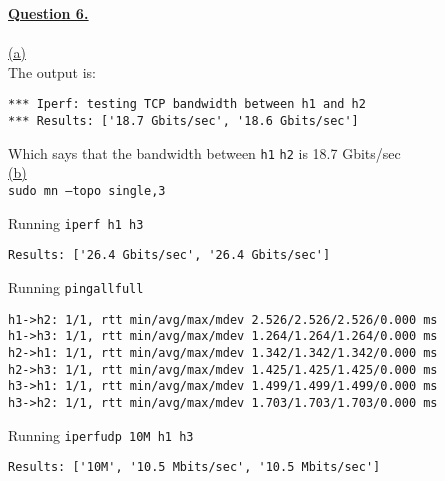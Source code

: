 \documentclass[12pt]{article}
\begin{document}
\newpage
\hyperlink{toc}{\LARGE \underline{\textbf{Question 6.}}}\\
~\\\hyperlink{toc}{\hypertarget{6.1}{(a)}}\\
The output is:
\begin{verbatim}
*** Iperf: testing TCP bandwidth between h1 and h2
*** Results: ['18.7 Gbits/sec', '18.6 Gbits/sec']
\end{verbatim}
Which says that the bandwidth between \texttt{h1} \texttt{h2} is 18.7 Gbits/sec
~\\\hyperlink{toc}{\hypertarget{6.2}{(b)}}\\
\texttt{sudo mn --topo single,3}
\begin{adjustwidth}{10mm}{}
	Running \texttt{iperf h1 h3}
	\begin{verbatim}
Results: ['26.4 Gbits/sec', '26.4 Gbits/sec']
  \end{verbatim}
	Running \texttt{pingallfull}
	\begin{verbatim}
h1->h2: 1/1, rtt min/avg/max/mdev 2.526/2.526/2.526/0.000 ms
h1->h3: 1/1, rtt min/avg/max/mdev 1.264/1.264/1.264/0.000 ms
h2->h1: 1/1, rtt min/avg/max/mdev 1.342/1.342/1.342/0.000 ms
h2->h3: 1/1, rtt min/avg/max/mdev 1.425/1.425/1.425/0.000 ms
h3->h1: 1/1, rtt min/avg/max/mdev 1.499/1.499/1.499/0.000 ms
h3->h2: 1/1, rtt min/avg/max/mdev 1.703/1.703/1.703/0.000 ms
  \end{verbatim}
	Running \texttt{iperfudp 10M h1 h3}
	\begin{verbatim}
Results: ['10M', '10.5 Mbits/sec', '10.5 Mbits/sec']
  \end{verbatim}
\end{adjustwidth}
\end{document}
